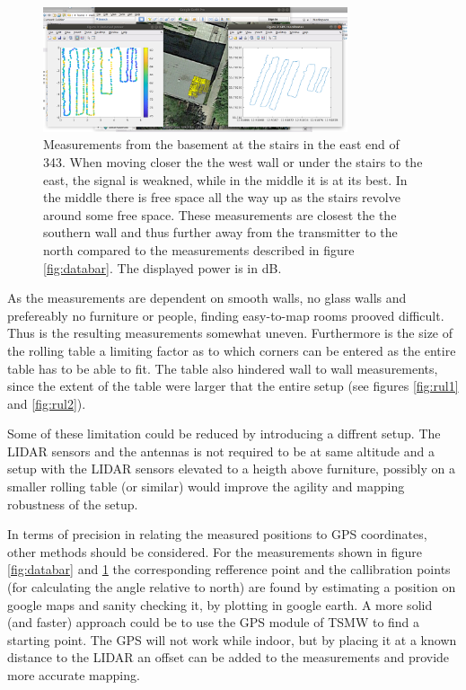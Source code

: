 \documentclass[a4paper,twoside, 12pt]{article}
\begin{document}
\begin{figure}[ht!]
\centering
\includegraphics[width=0.8\textwidth]{stairs.png}
\caption{Measurements from the basement at the stairs in the east end of 343. When moving closer the the west wall or under the stairs to the east, the signal is weakned, while in the middle it is at its best. In the middle there is free space all the way up as the stairs revolve around some free space. These measurements are closest the the southern wall and thus further away from the transmitter to the north compared to the measurements described in figure \ref{fig:databar}. The displayed power is in dB.}
\label{fig:basementEast}
\end{figure}

As the measurements are dependent on smooth walls, no glass walls and prefereably no furniture or people, finding easy-to-map rooms prooved difficult. Thus is the resulting measurements somewhat uneven. Furthermore is the size of the rolling table a limiting factor as to which corners can be entered as the entire table has to be able to fit. The table also hindered wall to wall measurements, since the extent of the table were larger that the entire setup (see figures \ref{fig:rul1} and \ref{fig:rul2}).

Some of these limitation could be reduced by introducing a diffrent setup. The LIDAR sensors and the antennas is not required to be at same altitude and a setup with the LIDAR sensors elevated to a heigth above furniture, possibly on a smaller rolling table (or similar) would improve the agility and mapping robustness of the setup. 

In terms of precision in relating the measured positions to GPS coordinates, other methods should be considered. For the measurements shown in figure \ref{fig:databar} and \ref{fig:basementEast} the corresponding refference point and the callibration points (for calculating the angle relative to north) are found by estimating a position on google maps and sanity checking it, by plotting in google earth. A more solid (and faster) approach could be to use the GPS module of TSMW to find a starting point. The GPS will not work while indoor, but by placing it at a known distance to the LIDAR an offset can be added to the measurements and provide more accurate mapping.
 
\end{document}
